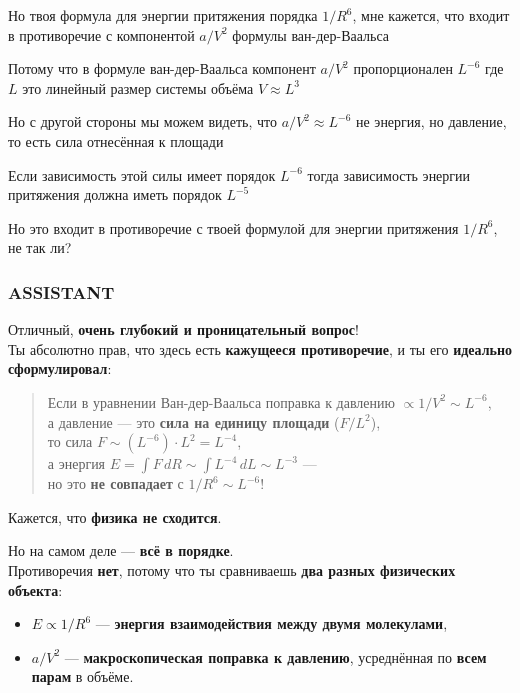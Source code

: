 \documentclass[11pt]{article}
\providecommand{\tightlist}{%
      \setlength{\itemsep}{0pt}\setlength{\parskip}{0pt}}
\begin{document}
Но твоя формула для энергии притяжения порядка \(1/R^6\), мне кажется,
что входит в противоречие с компонентой \(a/V^2\) формулы
ван-дер-Ваальса

Потому что в формуле ван-дер-Ваальса компонент \(a/V^2\) пропорционален
\(L^{-6}\) где \(L\) это линейный размер системы объёма
\(V \approx L^3\)

Но с другой стороны мы можем видеть, что \(a/V^2 \approx L^{-6}\) не
энергия, но давление, то есть сила отнесённая к площади

Если зависимость этой силы имеет порядок \(L^{-6}\) тогда зависимость
энергии притяжения должна иметь порядок \(L^{-5}\)

Но это входит в противоречие с твоей формулой для энергии притяжения
\(1/R^6\), не так ли?

\subsubsection{ASSISTANT}\label{assistant-10}

Отличный, \textbf{очень глубокий и проницательный вопрос}!\\
Ты абсолютно прав, что здесь есть \textbf{кажущееся противоречие}, и ты
его \textbf{идеально сформулировал}:

\begin{quote}
Если в уравнении Ван-дер-Ваальса поправка к давлению
\(\propto 1/V^2 \sim L^{-6}\),\\
а давление --- это \textbf{сила на единицу площади} (\(F / L^2\)),\\
то сила \(F \sim (L^{-6}) \cdot L^2 = L^{-4}\),\\
а энергия \(E = \int F\, dR \sim \int L^{-4}\, dL \sim L^{-3}\) ---\\
но это \textbf{не совпадает} с \(1/R^6 \sim L^{-6}\)!
\end{quote}

Кажется, что \textbf{физика не сходится}.

Но на самом деле --- \textbf{всё в порядке}.\\
Противоречия \textbf{нет}, потому что ты сравниваешь \textbf{два разных
физических объекта}:

\begin{itemize}
\tightlist
\item
  \(E \propto 1/R^6\) --- \textbf{энергия взаимодействия между двумя
  молекулами},
\item
  \(a/V^2\) --- \textbf{макроскопическая поправка к давлению},
  усреднённая по \textbf{всем парам} в объёме.
\end{itemize}
\end{document}
